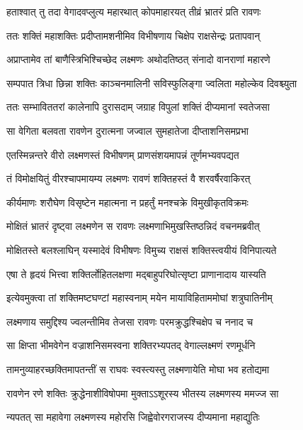 \twolineshloka
{हताश्वात् तु तदा वेगादवप्लुत्य महारथात्}
{कोपमाहारयत् तीव्रं भ्रातरं प्रति रावणः} %

\twolineshloka
{ततः शक्तिं महाशक्तिः प्रदीप्तामशनीमिव}
{विभीषणाय चिक्षेप राक्षसेन्द्रः प्रतापवान्} %

\twolineshloka
{अप्राप्तामेव तां बाणैस्त्रिभिश्चिच्छेद लक्ष्मणः}
{अथोदतिष्ठत् संनादो वानराणां महारणे} %

\twolineshloka
{सम्पपात त्रिधा छिन्ना शक्तिः काञ्चनमालिनी}
{सविस्फुलिङ्गा ज्वलिता महोल्केव दिवश्च्युता} %

\twolineshloka
{ततः सम्भाविततरां कालेनापि दुरासदाम्}
{जग्राह विपुलां शक्तिं दीप्यमानां स्वतेजसा} %

\twolineshloka
{सा वेगिता बलवता रावणेन दुरात्मना}
{जज्वाल सुमहातेजा दीप्ताशनिसमप्रभा} %

\twolineshloka
{एतस्मिन्नन्तरे वीरो लक्ष्मणस्तं विभीषणम्}
{प्राणसंशयमापन्नं तूर्णमभ्यवपद्यत} %

\twolineshloka
{तं विमोक्षयितुं वीरश्चापमायम्य लक्ष्मणः}
{रावणं शक्तिहस्तं वै शरवर्षैरवाकिरत्} %

\twolineshloka
{कीर्यमाणः शरौघेण विसृष्टेन महात्मना}
{न प्रहर्तुं मनश्चक्रे विमुखीकृतविक्रमः} %

\twolineshloka
{मोक्षितं भ्रातरं दृष्ट्वा लक्ष्मणेन स रावणः}
{लक्ष्मणाभिमुखस्तिष्ठन्निदं वचनमब्रवीत्} %

\twolineshloka
{मोक्षितस्ते बलश्लाघिन् यस्मादेवं विभीषणः}
{विमुच्य राक्षसं शक्तिस्त्वयीयं विनिपात्यते} %

\twolineshloka
{एषा ते हृदयं भित्त्वा शक्तिर्लोहितलक्षणा}
{मद्बाहुपरिघोत्सृष्टा प्राणानादाय यास्यति} %

\twolineshloka
{इत्येवमुक्त्वा तां शक्तिमष्टघण्टां महास्वनाम्}
{मयेन मायाविहिताममोघां शत्रुघातिनीम्} %

\twolineshloka
{लक्ष्मणाय समुद्दिश्य ज्वलन्तीमिव तेजसा}
{रावणः परमक्रुद्धश्चिक्षेप च ननाद च} %

\twolineshloka
{सा क्षिप्ता भीमवेगेन वज्राशनिसमस्वना}
{शक्तिरभ्यपतद् वेगाल्लक्ष्मणं रणमूर्धनि} %

\twolineshloka
{तामनुव्याहरच्छक्तिमापतन्तीं स राघवः}
{स्वस्त्यस्तु लक्ष्मणायेति मोघा भव हतोद्यमा} %

\twolineshloka
{रावणेन रणे शक्तिः क्रुद्धेनाशीविषोपमा}
{मुक्ताऽऽशूरस्य भीतस्य लक्ष्मणस्य ममज्ज सा} %

\twolineshloka
{न्यपतत् सा महावेगा लक्ष्मणस्य महोरसि}
{जिह्वेवोरगराजस्य दीप्यमाना महाद्युतिः} %


